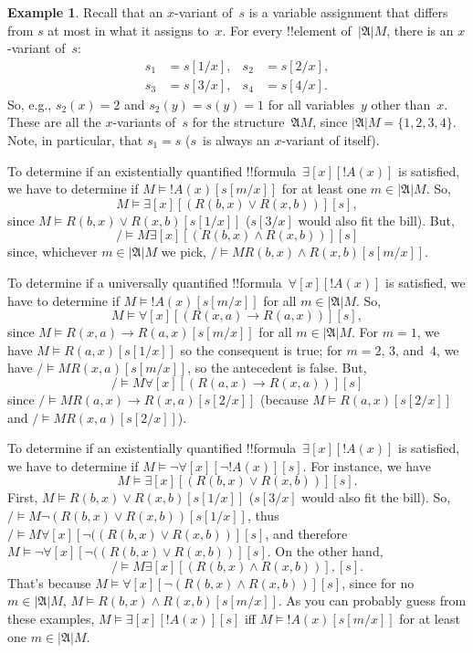 \documentclass[10pt,a4paper]{article}
\makeatletter
\theoremstyle{plain}
\theoremstyle{definition}
\newtheorem{ex}[thm]{Example}
\theoremstyle{remark}
\providecommand{\lif}{\mathbin{\rightarrow}}
\providecommand{\lforall}{\mathord{\forall}}
\providecommand{\lexists}{\mathord{\exists}}
\providecommand{\Subst}[3]{#1[#2/#3]}
\providecommand{\Struct}{\ensuremath{\mathfrak{A}}}
\providecommand{\Domain}{\ensuremath{|\mathfrak{A}|}}
\providecommand{\Sat}[2]{\ensuremath{#1 \models #2}}
\providecommand{\iftag}[1]{#1}
\providecommand{\iftag}{}
\def\iftag#1#2#3{\iftag@stop{#2}\iftag@more}
\def\iftag@more{\@ifnextchar\bgroup{\iftag@eat}{\relax}}
\def\iftag@eat#1{}
\def\iftag@stop#1{#1}
\makeatother
\begin{document}
\begin{ex}
Recall that an $x$-variant of~$s$ is a variable assignment that
differs from $s$ at most in what it assigns to~$x$. For every
!!{element} of~$\Domain{M}$, there is an $x$-variant of~$s$:
\begin{align*}
  s_1 & = \Subst{s}{1}{x}, &
  s_2 & = \Subst{s}{2}{x},\\
  s_3 & = \Subst{s}{3}{x}, &
  s_4 & = \Subst{s}{4}{x}.
\end{align*}
So, e.g., $s_2(x) = 2$ and $s_2(y) = s(y) = 1$ for all variables~$y$
other than~$x$. These are all the $x$-variants of~$s$ for the
structure~$\Struct{M}$, since $\Domain{M} = \{1, 2, 3, 4\}$. Note, in
particular, that $s_1 = s$ ($s$~is always an $x$-variant of itself).

\iftag{prvEx}{To determine if an existentially quantified
  !!{formula}~$\lexists[x][!A(x)]$ is satisfied, we have to determine
  if $\Sat{M}{!A(x)}[\Subst{s}{m}{x}]$ for at least one $m \in \Domain
  M$. So,
  \[
  \Sat{M}{\lexists[x][(R(b,x) \lor R(x,b))]}[s],
  \]
  since $\Sat{M}{R(b,x) \lor R(x, b)}[\Subst{s}{1}{x}]$
  ($\Subst{s}{3}{x}$ would also fit the bill).  But,
  \[
  \Sat/{M}{\lexists[x][(R(b,x) \land R(x,b))]}[s]
  \]
  since, whichever $m \in \Domain{M}$ we pick, $\Sat/{M}{R(b,x) \land R(x,b)}[\Subst{s}{m}{x}]$.}{}

\iftag{prvAll}{To determine if a universally quantified
  !!{formula}~$\lforall[x][!A(x)]$ is satisfied, we have to determine
  if $\Sat{M}{!A(x)}[\Subst{s}{m}{x}]$ for all $m \in \Domain M$. So,
  \[
  \Sat{M}{\lforall[x][(R(x,a) \lif R(a,x))]}[s],
  \]
  since $\Sat{M}{R(x,a) \lif R(a,x)}[\Subst{s}{m}{x}]$ for all $m \in
  \Domain M$. For $m = 1$, we have $\Sat{M}{R(a,x)}[\Subst{s}{1}{x}]$
  so the consequent is true; for $m = 2$, $3$, and~$4$, we have
  $\Sat/{M}{R(x,a)}[\Subst{s}{m}{x}]$, so the antecedent is false.
  But,
  \[
  \Sat/{M}{\lforall[x][(R(a,x) \lif R(x,a))]}[s]
  \]
  since $\Sat/{M}{R(a,x) \lif R(x,a)}[\Subst{s}{2}{x}]$ (because
  $\Sat{M}{R(a, x)}[\Subst{s}{2}{x}]$ and $\Sat/{M}{R(x,
  a)}[\Subst{s}{2}{x}]$).}{}

\iftag{defEx}{To determine if an existentially quantified
  !!{formula}~$\lexists[x][!A(x)]$ is satisfied, we have to determine
  if $\Sat{M}{\lnot \lforall[x][\lnot !A(x)]}[s]$. For instance, we
  have
  \[
  \Sat{M}{\lexists[x][(R(b,x) \lor R(x,b))]}[s].
  \]
  First, $\Sat{M}{R(b,x) \lor R(x, b)}[\Subst{s}{1}{x}]$
  ($\Subst{s}{3}{x}$ would also fit the bill).  So,
  $\Sat/{M}{\lnot(R(b,x) \lor R(x,b))}[\Subst{s}{1}{x}]$, thus
  $\Sat/{M}{\lforall[x][\lnot((R(b,x) \lor R(x,b))]}[s]$, and
  therefore $\Sat{M}{\lnot\lforall[x][\lnot((R(b,x) \lor
  R(x,b))]}[s]$. On the other hand,
  \[
  \Sat/{M}{\lexists[x][(R(b,x) \land R(x,b))],}[s].
  \]
  That's because $\Sat{M}{\lforall[x][\lnot(R(b,x) \land
  R(x,b))]}[s]$, since for no $m \in \Domain M$, $\Sat{M}{R(b,x) \land
  R(x,b)}[\Subst{s}{m}{x}]$. As you can probably guess from these
  examples, $\Sat{M}{\lexists[x][!A(x)]}[s]$ iff
  $\Sat{M}{!A(x)}[\Subst{s}{m}{x}]$ for at least one $m \in \Domain
  M$.}{}


\end{ex}
\end{document}
